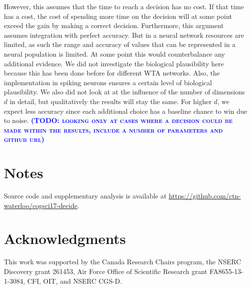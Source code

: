 \documentclass[10pt,letterpaper]{article}
\makeatletter
\newcommand{\todo}[1]{\textbf{\textsc{\textcolor{blue}{(TODO\@: #1)}}}}
\makeatother
\begin{document}
However, this assumes that the time to reach a decision has no cost.
If that time has a cost, the cost of spending more time on the decision will at some point exceed the gain by making a correct decision.
Furthermore, this argument assumes integration with perfect accuracy.
But in a neural network resources are limited, as such the range and accuracy of values that can be represented in a neural population is limited.
At some point this would counterbalance any additional evidence.
We did not investigate the biological plausibility here because this has been done before for different WTA networks.
Also, the implementation in spiking neurons ensures a certain level of biological plausibility.
We also did not look at at the influence of the number of dimensions $d$ in detail, but qualitatively the results will stay the same.
For higher $d$, we expect less accuracy since each additional choice has a baseline chance to win due to noise.
\todo{looking only at cases where a decision could be made within the results, include a number of parameters and github url}

\section{Notes}
Source code and supplementary analysis is available at \url{https://github.com/ctn-waterloo/cogsci17-decide}.

\section{Acknowledgments}
This work was supported by the Canada Research Chairs program,
the NSERC Discovery grant 261453, Air Force Office of Scientific Research grant FA8655-13-1-3084, CFI, OIT, and NSERC CGS-D\@.  %



\setlength{\bibleftmargin}{.125in}
\setlength{\bibindent}{-\bibleftmargin}


\end{document}
